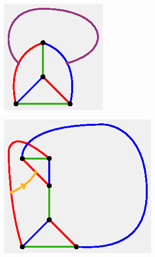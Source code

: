 \documentclass[11pt, oneside]{amsart}
\theoremstyle{theorem}
\theoremstyle{definition}
\theoremstyle{theorem}
\begin{document}
\begin{figure}[h!]
\begin{subfigure}{.24\textwidth}
  \label{nxb2}
\end{subfigure}
\begin{subfigure}{.24\textwidth}
  \centering
  \includegraphics[width=.9\linewidth]{nonbt3.eps}
  \label{nxb3}
\end{subfigure}%
\begin{subfigure}{.24\textwidth}
  \centering
  \includegraphics[width=.9\linewidth]{nonbt4.eps}
  \label{nxb4}

\end{subfigure}
\end{figure}
\end{document}
